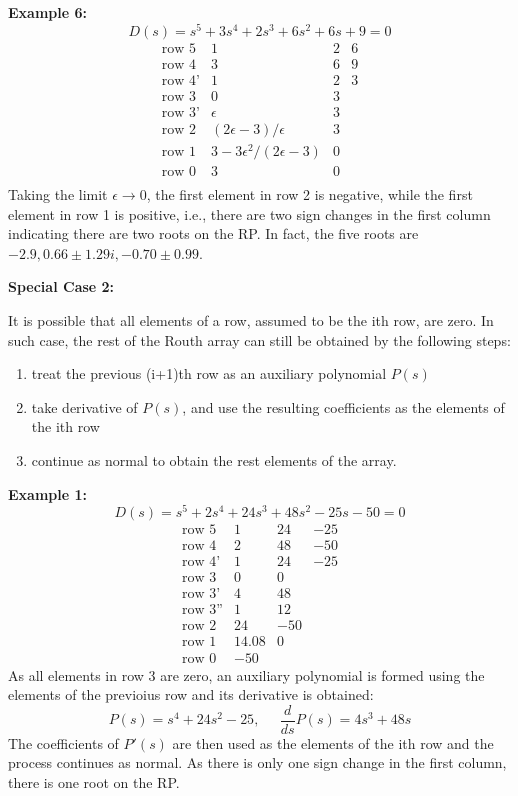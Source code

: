 \documentclass[12pt]{article}
\begin{document}
{\bf Example 6:}
\[ D(s)=s^5+3s^4+2s^3+6s^2+6s+9=0 \]
\[ \begin{array}{lrrr}
\mbox{row 5} & 1 & 2 & 6 \\
\mbox{row 4} & 3 & 6 & 9 \\
\mbox{row 4'}& 1 & 2 & 3 \\
\mbox{row 3} & 0 & 3 &   \\
\mbox{row 3'}& \epsilon & 3 &   \\
\mbox{row 2} & (2\epsilon-3)/\epsilon & 3 &  \\
\mbox{row 1} & 3-3\epsilon^2/(2\epsilon-3) & 0 &  \\
\mbox{row 0} & 3 & 0 &  \\
\end{array} \]
Taking the limit $\epsilon\rightarrow 0$, the first element in row 2 is negative,
while the first element in row 1 is positive, i.e., there are two sign changes
in the first column indicating there are two roots on the RP. In fact, the five
roots are $-2.9, 0.66\pm 1.29i, -0.70\pm 0.99$.

{\bf Special Case 2:}

It is possible that all elements of a row, assumed to be the ith row, are zero. 
In such case, the rest of the Routh array can still be obtained by the following
steps:
\begin{enumerate}
\item treat the previous (i+1)th row as an auxiliary polynomial $P(s)$
\item take derivative of $P(s)$, and use the resulting coefficients as the
  elements of the ith row
\item continue as normal to obtain the rest elements of the array.
\end{enumerate}

{\bf Example 1: }
\[ D(s)=s^5+2s^4+24s^3+48s^2-25s-50=0 \]
\[ \begin{array}{lrrr}
\mbox{row 5} & 1 & 24 & -25 \\
\mbox{row 4} & 2 & 48 & -50 \\
\mbox{row 4'}& 1 & 24 & -25 \\
\mbox{row 3} & 0 &  0 &     \\
\mbox{row 3'}& 4 &  48 &    \\
\mbox{row 3''}& 1 &  12 &   \\
\mbox{row 2} & 24 & -50 &   \\
\mbox{row 1} & 14.08 & 0 &  \\
\mbox{row 0} & -50  &  &    
\end{array} \]
As all elements in row 3 are zero, an auxiliary polynomial is formed using the elements
of the previoius row and its derivative is obtained:
\[ P(s)=s^4+24s^2-25,\;\;\;\;\;\frac{d}{ds}P(s)=4s^3+48s \]
The coefficients of $P'(s)$ are then used as the elements of the ith row and the process
continues as normal. As there is only one sign change in the first column, there is one
root on the RP.
\end{document}
